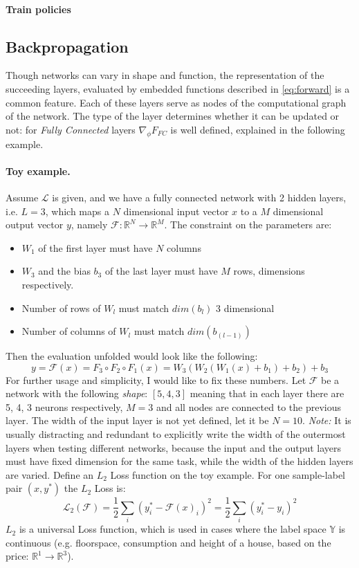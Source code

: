\paragraph{Train policies} 

\subsection{Backpropagation} 
Though networks can vary in shape and function, the representation of the succeeding layers, evaluated by embedded functions described in \ref{eq:forward} is a common feature. Each of these layers serve as nodes of the computational graph of the network. The type of the layer determines whether it can be updated or not: for \emph{Fully Connected} layers $\nabla_\phi F_{FC}$ is well defined, explained in the following example.

\paragraph{Toy example.} 
Assume $\mathcal{L}$ is given, and we have a fully connected network with 2 hidden layers, i.e. $L=3$, which maps a $N$ dimensional input vector $x$ to a $M$ dimensional output vector $y$, namely $\mathcal{F}:\mathbb{R}^N \rightarrow \mathbb{R}^M$. The constraint on the parameters are:
\begin{itemize}
    \item[] $W_1$ of the first layer must have $N$ columns
    \item[] $W_3$ and the bias $b_3$ of the last layer must have $M$ rows, dimensions respectively.
    \item[] Number of rows of $W_l$ must match $dim(b_l)$ $3$ dimensional
    \item[] Number of columns of $W_l$ must match $dim(b_{(l-1)})$
\end{itemize} 
Then the evaluation unfolded would look like the following: 
$$y = \mathcal{F}(x) = F_3 \circ F_2 \circ F_1(x) = W_3(W_2(W_1(x)+b_1)+b_2)+b_3$$
For further usage and simplicity, I would like to fix these numbers.
Let $\mathcal{F}$ be a network with the following \emph{shape}: $\left[5, 4, 3\right] $
meaning that in each layer there are 5, 4, 3 neurons respectively, $M=3$ and all nodes are connected to the previous layer. The width of the input layer is not yet defined, let it be $N=10$. 
\emph{Note:} It is usually distracting and redundant to explicitly write the width of the outermost layers when testing different networks, because the input and the output layers must have fixed dimension for the same task, while the width of the hidden layers are varied.
Define an $L_2$ Loss function on the toy example. For one sample-label pair $(x,y^*)$ the $L_2$ Loss is:
\begin{equation}
    \mathcal{L}_2(\mathcal{F}) = \frac{1}{2} \sum_{i} (y_i^* - \mathcal{F}(x)_i)^2 = \frac{1}{2} \sum_{i} (y_i^* - y_i)^2
\end{equation}
$L_2$ is a universal Loss function, which is used in cases where the label space $\mathbb{Y}$ is continuous (e.g. floorspace, consumption and height of a house, based on the price: $\mathbb{R}^1 \rightarrow \mathbb{R}^3$).

